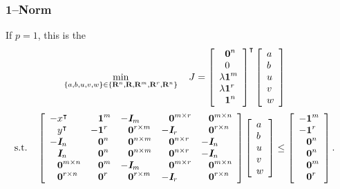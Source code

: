 \documentclass{article}
\begin{document}
\subsubsection{1--Norm}

    If $p=1$, this is the \LP
    \begin{align*}
        \min_{\{a,b,u,v,w\}\in\{\textbf{R}^n,\textbf{R},\textbf{R}^m,\textbf{R}^r,\textbf{R}^n\}}  \quad J 
        & = \left[\begin{array}{lllllllllllllllllll}
            \phantom{\lambda}\textbf{0}^{n}\\
            \phantom{\lambda}0\\
            \lambda\textbf{1}^{m}\\
            \lambda\textbf{1}^{r}\\
            \phantom{\lambda}\textbf{1}^n
        \end{array}\right]^\intercal
        \left[\begin{array}{lllllllllllllllllll}
            a\\
            b\\
            u\\
            v\\
            w
        \end{array}\right]
    \end{align*}
    \begin{align*}
        \st\quad
        \mat{
                -x^\tp
            &
                \minus \ones^m
            &
                - \eye_m
            &   
                \minus \zeros^{m\times r}
            &
                \minus \zeros^{m\times n}
            \\
                \minus y^\tp
            &
                -\ones^r
            &
                \minus \zeros^{r\times m}
            &
                - \eye_r
            &
                \minus \zeros^{r\times n}
            \\
            -\eye_n & \minus \zeros^{n} & \minus \zeros^{n\times m} & \minus \zeros^{n\times r} & -\eye_n
            \\
            \minus \eye_n & \minus \zeros^n & \minus \zeros^{n\times m} &\minus \zeros^{n\times r} & -\eye_n
            \\
            \minus \zeros^{m\times n} & \minus \zeros^m & -\eye_m & \minus \zeros^{m\times r} & \minus \zeros^{m\times n}
            \\
            \minus \zeros^{r\times n} & \minus \zeros^r & \minus \zeros^{r\times m} & -\eye_r & \minus \zeros^{r\times n}
            }
        &\mat{a \\ b \\ u \\ v \\ w}
        \leq
        \mat{ -\ones^m \\ -\ones^r \\ \minus \zeros^n \\ \minus \zeros^n \\ \minus \zeros^m \\ \minus \zeros^r }.
    \end{align*}
\end{document}
